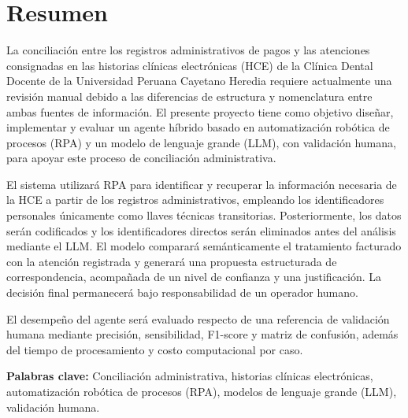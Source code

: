 \chapter*{Resumen}

La conciliación entre los registros administrativos de pagos y las atenciones consignadas en las historias clínicas electrónicas (HCE) de la Clínica Dental Docente de la Universidad Peruana Cayetano Heredia requiere actualmente una revisión manual debido a las diferencias de estructura y nomenclatura entre ambas fuentes de información. El presente proyecto tiene como objetivo diseñar, implementar y evaluar un agente híbrido basado en automatización robótica de procesos (RPA) y un modelo de lenguaje grande (LLM), con validación humana, para apoyar este proceso de conciliación administrativa.

El sistema utilizará RPA para identificar y recuperar la información necesaria de la HCE a partir de los registros administrativos, empleando los identificadores personales únicamente como llaves técnicas transitorias. Posteriormente, los datos serán codificados y los identificadores directos serán eliminados antes del análisis mediante el LLM. El modelo comparará semánticamente el tratamiento facturado con la atención registrada y generará una propuesta estructurada de correspondencia, acompañada de un nivel de confianza y una justificación. La decisión final permanecerá bajo responsabilidad de un operador humano.

El desempeño del agente será evaluado respecto de una referencia de validación humana mediante precisión, sensibilidad, F1-score y matriz de confusión, además del tiempo de procesamiento y costo computacional por caso.

\vspace{1.5em}
\noindent \textbf{Palabras clave:} Conciliación administrativa, historias clínicas electrónicas, automatización robótica de procesos (RPA), modelos de lenguaje grande (LLM), validación humana.
